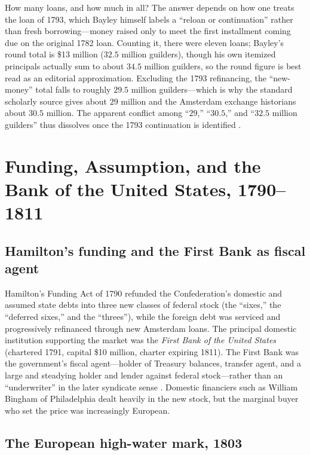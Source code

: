 \documentclass[12pt]{article}
\begin{document}
How many loans, and how much in all? The answer depends on how one treats the
loan of 1793, which Bayley himself labels a ``reloan or continuation'' rather than
fresh borrowing---money raised only to meet the first installment coming due on
the original 1782 loan. Counting it, there were eleven loans; Bayley's round total
is \$13 million ($32.5$ million guilders), though his own itemized principals
actually sum to about $34.5$ million guilders, so the round figure is best read as
an editorial approximation. Excluding the 1793 refinancing, the ``new-money''
total falls to roughly $29.5$ million guilders---which is why the standard
scholarly source \citep{vanwinter1977american} gives about $29$ million and the
Amsterdam exchange historians about $30.5$ million. The apparent conflict among
``$29$,'' ``$30.5$,'' and ``$32.5$ million guilders'' thus dissolves once the 1793
continuation is identified \citep[310--321]{bayley1881national}.

\section{Funding, Assumption, and the Bank of the United States, 1790--1811}

\subsection{Hamilton's funding and the First Bank as fiscal agent}

Hamilton's Funding Act of 1790 refunded the Confederation's domestic and
assumed state debts into three new classes of federal stock (the ``sixes,''
the ``deferred sixes,'' and the ``threes''), while the foreign debt was
serviced and progressively refinanced through new Amsterdam loans. The
principal domestic institution supporting the market was the \emph{First Bank
of the United States} (chartered 1791, capital \$10 million, charter expiring
1811). The First Bank was the government's fiscal agent---holder of Treasury
balances, transfer agent, and a large and steadying holder and lender against
federal stock---rather than an ``underwriter'' in the later syndicate sense
\citep{hammond1957banks, sylla2011financial}. Domestic financiers such as
William Bingham of Philadelphia dealt heavily in the new stock, but the marginal
buyer who set the price was increasingly European.

\subsection{The European high-water mark, 1803}
\end{document}

